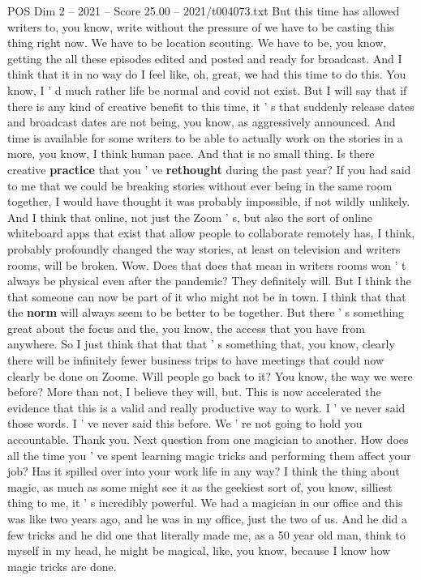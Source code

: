 \begin{textsample}{POS Dim 2 – 2021 – Score 25.00 – 2021/t004073.txt}
But this time has allowed writers to, you know, write without the pressure of we have to be casting this thing right now.
We have to be location scouting.
We have to be, you know, getting the all these episodes edited and posted and ready for broadcast.
And I think that it in no way do I feel like, oh, great, we had this time to do this.
You know, I ' d much rather life be normal and covid not exist.
But I will say that if there is any kind of creative benefit to this time, it ' s that suddenly release dates and broadcast dates are not being, you know, as aggressively announced.
And time is available for some writers to be able to actually work on the stories in a more, you know, I think human pace.
And that is no small thing.
Is there creative \textbf{practice} that you ' ve \textbf{rethought} during the past year?
If you had said to me that we could be breaking stories without ever being in the same room together, I would have thought it was probably impossible, if not wildly unlikely.
And I think that online, not just the Zoom ' s, but also the sort of online whiteboard apps that exist that allow people to collaborate remotely has, I think, probably profoundly changed the way stories, at least on television and writers rooms, will be broken.
Wow.
Does that does that mean in writers rooms won ' t always be physical even after the pandemic?
They definitely will.
But I think the that someone can now be part of it who might not be in town.
I think that that the \textbf{norm} will always seem to be better to be together.
But there ' s something great about the focus and the, you know, the access that you have from anywhere.
So I just think that that that ' s something that, you know, clearly there will be infinitely fewer business trips to have meetings that could now clearly be done on Zoome.
Will people go back to it?
You know, the way we were before?
More than not, I believe they will, but.
This is now accelerated the evidence that this is a valid and really productive way to work.
I ' ve never said those words.
I ' ve never said this before.
We ' re not going to hold you accountable.
Thank you.
Next question from one magician to another.
How does all the time you ' ve spent learning magic tricks and performing them affect your job?
Has it spilled over into your work life in any way?
I think the thing about magic, as much as some might see it as the geekiest sort of, you know, silliest thing to me, it ' s incredibly powerful.
We had a magician in our office and this was like two years ago, and he was in my office, just the two of us.
And he did a few tricks and he did one that literally made me, as a 50 year old man, think to myself in my head, he might be magical, like, you know, because I know how magic tricks are done.

\end{textsample}
